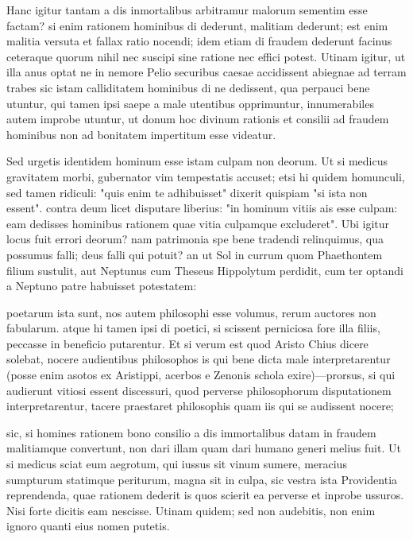  Hanc igitur tantam a dis inmortalibus arbitramur malorum sementim esse factam? si enim rationem hominibus di dederunt, malitiam dederunt; est enim malitia versuta et fallax ratio nocendi; idem etiam di fraudem dederunt facinus ceteraque quorum nihil nec suscipi sine ratione nec effici potest. Utinam igitur, ut illa anus optat ne in nemore Pelio securibus caesae accidissent abiegnae ad terram trabes sic istam calliditatem hominibus di ne dedissent, qua perpauci bene utuntur, qui tamen ipsi saepe a male utentibus opprimuntur, innumerabiles autem improbe utuntur, ut donum hoc divinum rationis et consilii ad fraudem hominibus non ad bonitatem impertitum esse videatur.

 Sed urgetis identidem hominum esse istam culpam non deorum. Ut si medicus gravitatem morbi, gubernator vim tempestatis accuset; etsi hi quidem homunculi, sed tamen ridiculi: "quis enim te adhibuisset" dixerit quispiam "si ista non essent". contra deum licet disputare liberius: "in hominum vitiis ais esse culpam: eam dedisses hominibus rationem quae vitia culpamque excluderet". Ubi igitur locus fuit errori deorum? nam patrimonia spe bene tradendi relinquimus, qua possumus falli; deus falli qui potuit? an ut Sol in currum quom Phaethontem filium sustulit, aut Neptunus cum Theseus Hippolytum perdidit, cum ter optandi a Neptuno patre habuisset potestatem:

 poetarum ista sunt, nos autem philosophi esse volumus, rerum auctores non fabularum. atque hi tamen ipsi di poetici, si scissent perniciosa fore illa filiis, peccasse in beneficio putarentur. Et si verum est quod Aristo Chius dicere solebat, nocere audientibus philosophos is qui bene dicta male interpretarentur (posse enim asotos ex Aristippi, acerbos e Zenonis schola exire)—prorsus, si qui audierunt vitiosi essent discessuri, quod perverse philosophorum disputationem interpretarentur, tacere praestaret philosophis quam iis qui se audissent nocere;

 sic, si homines rationem bono consilio a dis immortalibus datam in fraudem malitiamque convertunt, non dari illam quam dari humano generi melius fuit. Ut si medicus sciat eum aegrotum, qui iussus sit vinum sumere, meracius sumpturum statimque periturum, magna sit in culpa, sic vestra ista Providentia reprendenda, quae rationem dederit is quos scierit ea perverse et inprobe ussuros. Nisi forte dicitis eam nescisse. Utinam quidem; sed non audebitis, non enim ignoro quanti eius nomen putetis.

